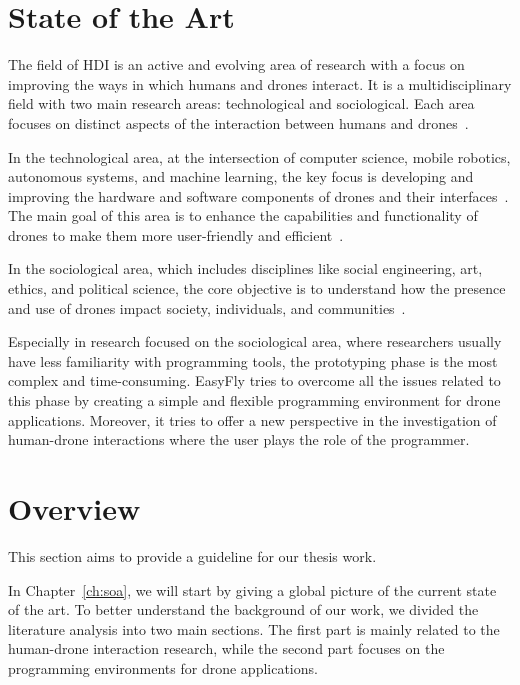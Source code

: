 \section{State of the Art}\label{sec:intro_soa}
The field of HDI is an active and evolving area of research with a focus on improving the ways in which humans
and drones interact. It is a multidisciplinary field with two main research areas: technological and sociological.
Each area focuses on distinct aspects of the interaction between humans and drones~\cite{hri2009davidMaya}.

In the technological area, at the intersection of computer science, mobile robotics, autonomous systems, and machine learning,
the key focus is developing and improving the hardware and software components of drones and their interfaces~\cite{kolling2012towards, giusti2012distributed}.
The main goal of this area is to enhance the capabilities and functionality of drones to make them more user-friendly and efficient~\cite{cauchard2015droneAndMe}.

In the sociological area, which includes disciplines like social engineering, art, ethics, and political science,
the core objective is to understand how the presence and use of drones impact society, individuals, and communities~\cite{eriksson2020ethicsInMovement, anderson2012accidentally}.

Especially in research focused on the sociological area, where researchers usually have less familiarity with programming tools, 
the prototyping phase is the most complex and time-consuming. 
EasyFly tries to overcome all the issues related to this phase by creating a simple and flexible programming environment for drone applications.
Moreover, it tries to offer a new perspective in the investigation of human-drone interactions where the user plays the role of the programmer.

\section{Overview}\label{sec:intro_overview}
This section aims to provide a guideline for our thesis work.

In Chapter~\ref{ch:soa}, we will start by giving a global picture of the current state of the art.
To better understand the background of our work, we divided the literature analysis into two main sections. 
The first part is mainly related to the human-drone interaction research, while the second part focuses on the programming environments for drone applications.

